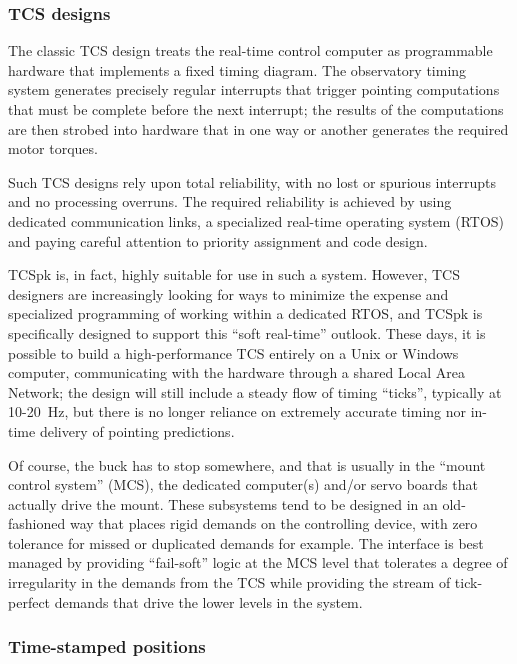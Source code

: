 \documentclass[12pt,fleqn,twoside]{article}
\renewcommand{\_}{{\tt\char'137}}     %
\begin{document}
\subsubsection{TCS designs}

The classic TCS design treats the
real-time control computer as programmable hardware that
implements a fixed timing diagram.
The observatory
timing system generates precisely regular interrupts that trigger
pointing
computations that must be complete before the next interrupt;  the
results of the computations are then strobed into hardware
that in one way or another generates the required motor torques.

Such TCS designs rely upon total reliability, with no lost or spurious
interrupts and no processing overruns.  The required reliability is
achieved by using dedicated communication links,
a specialized real-time operating system (RTOS) and
paying careful attention to priority assignment and code design.

TCSpk is, in fact, highly suitable for use in such a system.  However,
TCS designers
are increasingly looking for ways to minimize the expense and
specialized programming of working within a dedicated RTOS, and TCSpk
is specifically designed to support this
``soft real-time'' outlook.  These days, it is
possible to build a high-performance
TCS entirely on a Unix or Windows computer,
communicating with the hardware through a shared Local Area
Network;  the design will still include
a steady flow of timing ``ticks'', typically at 10-20~Hz,
but there is no longer reliance on extremely accurate timing nor
in-time delivery of pointing predictions.

Of course, the buck has to stop somewhere, and that is usually in
the ``mount control system'' (MCS), the dedicated computer(s) and/or
servo boards that actually drive the mount.  These subsystems tend to be
designed in an old-fashioned way that places rigid demands on the
controlling device, with zero tolerance for missed or
duplicated demands for example.  The interface is best managed by
providing ``fail-soft'' logic at the MCS level that tolerates a
degree of irregularity in the demands
from the TCS while providing the
stream of tick-perfect demands that drive the lower levels in the
system.

\subsubsection{Time-stamped positions}
\end{document}
